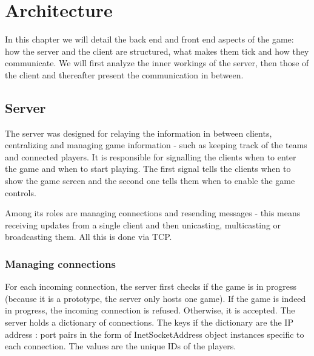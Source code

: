 \section{Architecture}

In this chapter we will detail the back end and front end aspects of the game:
how the server and the client are structured, what makes them tick and how they
communicate. We will first analyze the inner workings of the server, then those
of the client and thereafter present the communication in between.\newline

\subsection{Server}


The server was designed for relaying the information in between clients,
centralizing and managing game information - such as keeping track of the teams
and connected players. It is responsible for signalling the clients when to
enter the game and when to start playing. The first signal tells the clients
when to show the game screen and the second one tells them when to enable the
game controls.\newline

Among its roles are managing connections and resending messages - this means
receiving updates from a single client and then unicasting, multicasting or
broadcasting them. All this is done via TCP.\newline

\subsubsection{Managing connections}

For each incoming connection, the server first checks if the game is
in progress (because it is a prototype, the server only hosts one game). If
the game is indeed in progress, the incoming connection is refused. Otherwise,
it is accepted. The server holds a dictionary of connections.
The keys if the dictionary are the IP address : port pairs in the form of
InetSocketAddress object instances specific to each connection. The values
are the unique IDs of the players.\newline

